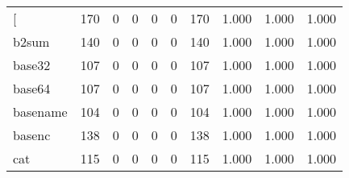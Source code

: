 \begin{longtable}{lp{1.3cm}p{1.3cm}p{1.3cm}p{1.3cm}p{1.3cm}p{1.3cm}p{1.3cm}p{1.3cm}p{1.3cm}}
\bottomrule
\endlastfoot
{[}         &                    170 &                                  0 &                                 0 &                                0 &                                 0 &                             170 &                                1.000 &                                  1.000 &                                1.000 \\
b2sum     &                    140 &                                  0 &                                 0 &                                0 &                                 0 &                             140 &                                1.000 &                                  1.000 &                                1.000 \\
base32    &                    107 &                                  0 &                                 0 &                                0 &                                 0 &                             107 &                                1.000 &                                  1.000 &                                1.000 \\
base64    &                    107 &                                  0 &                                 0 &                                0 &                                 0 &                             107 &                                1.000 &                                  1.000 &                                1.000 \\
basename  &                    104 &                                  0 &                                 0 &                                0 &                                 0 &                             104 &                                1.000 &                                  1.000 &                                1.000 \\
basenc    &                    138 &                                  0 &                                 0 &                                0 &                                 0 &                             138 &                                1.000 &                                  1.000 &                                1.000 \\
cat       &                    115 &                                  0 &                                 0 &                                0 &                                 0 &                             115 &                                1.000 &                                  1.000 &                                1.000 \\

\end{longtable}
